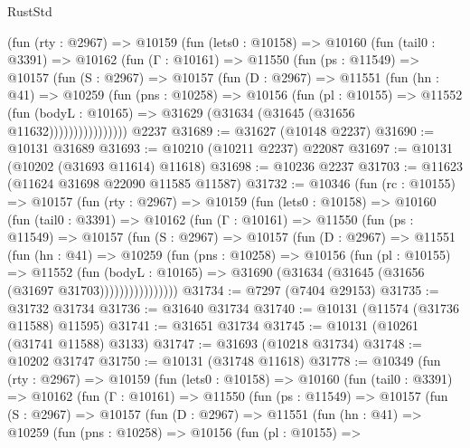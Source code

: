 \begin{lexlean}{RustStd}
\begin{coremodule}
        (fun (rty : @2967) =>
        @10159
          (fun (lets0 : @10158) =>
          @10160
            (fun (tail0 : @3391) =>
            @10162
              (fun (Γ : @10161) =>
              @11550
                (fun (ps : @11549) =>
                @10157
                  (fun (S : @2967) =>
                  @10157
                    (fun (D : @2967) =>
                    @11551
                      (fun (hn : @41) =>
                      @10259
                        (fun (pns : @10258) =>
                        @10156
                          (fun (pl : @10155) =>
                          @11552
                            (fun (bodyL : @10165) =>
                            @31629 (@31634 (@31645 (@31656 @11632))))))))))))))))
    @2237
@31689 := @31627 (@10148 @2237)
@31690 := @10131 @31689
@31693 := @10210 (@10211 @2237) @22087
@31697 := @10131 (@10202 (@31693 @11614) @11618)
@31698 := @10236 @2237
@31703 := @11623 (@11624 @31698 @22090 @11585 @11587)
@31732 := @10346
    (fun (rc : @10155) =>
    @10157
      (fun (rty : @2967) =>
      @10159
        (fun (lets0 : @10158) =>
        @10160
          (fun (tail0 : @3391) =>
          @10162
            (fun (Γ : @10161) =>
            @11550
              (fun (ps : @11549) =>
              @10157
                (fun (S : @2967) =>
                @10157
                  (fun (D : @2967) =>
                  @11551
                    (fun (hn : @41) =>
                    @10259
                      (fun (pns : @10258) =>
                      @10156
                        (fun (pl : @10155) =>
                        @11552
                          (fun (bodyL : @10165) =>
                          @31690 (@31634 (@31645 (@31656 (@31697 @31703))))))))))))))))
@31734 := @7297 (@7404 @29153)
@31735 := @31732 @31734
@31736 := @31640 @31734
@31740 := @10131 (@11574 (@31736 @11588) @11595)
@31741 := @31651 @31734
@31745 := @10131 (@10261 (@31741 @11588) @3133)
@31747 := @31693 (@10218 @31734)
@31748 := @10202 @31747
@31750 := @10131 (@31748 @11618)
@31778 := @10349
    (fun (rty : @2967) =>
    @10159
      (fun (lets0 : @10158) =>
      @10160
        (fun (tail0 : @3391) =>
        @10162
          (fun (Γ : @10161) =>
          @11550
            (fun (ps : @11549) =>
            @10157
              (fun (S : @2967) =>
              @10157
                (fun (D : @2967) =>
                @11551
                  (fun (hn : @41) =>
                  @10259
                    (fun (pns : @10258) =>
                    @10156
                      (fun (pl : @10155) =>

\end{coremodule}
\end{lexlean}
